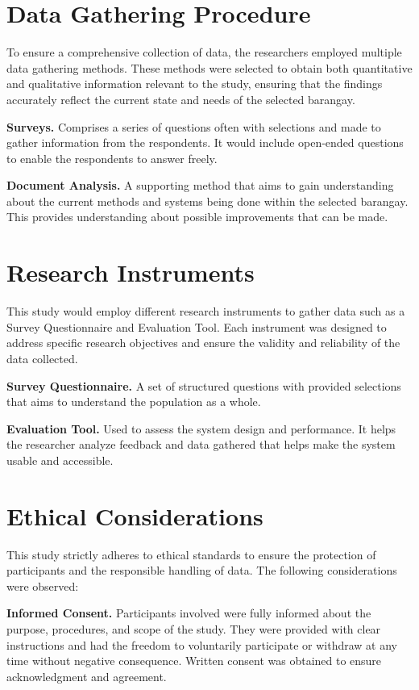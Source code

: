 \documentclass{research}
\begin{document}
\section{Data Gathering Procedure}

To ensure a comprehensive collection of data, the researchers employed multiple data gathering methods. These methods were selected to obtain both quantitative and qualitative information relevant to the study, ensuring that the findings accurately reflect the current state and needs of the selected barangay.

\textbf{Surveys.} Comprises a series of questions often with selections and made to gather information from the respondents. It would include open-ended questions to enable the respondents to answer freely.

\textbf{Document Analysis.} A supporting method that aims to gain understanding about the current methods and systems being done within the selected barangay. This provides understanding about possible improvements that can be made.

\section{Research Instruments}

This study would employ different research instruments to gather data such as a Survey Questionnaire and Evaluation Tool. Each instrument was designed to address specific research objectives and ensure the validity and reliability of the data collected.

\textbf{Survey Questionnaire.} A set of structured questions with provided selections that aims to understand the population as a whole.

\textbf{Evaluation Tool.} Used to assess the system design and performance. It helps the researcher analyze feedback and data gathered that helps make the system usable and accessible.

\section{Ethical Considerations}

This study strictly adheres to ethical standards to ensure the protection of participants and the responsible handling of data. The following considerations were observed:

\textbf{Informed Consent.} Participants involved were fully informed about the purpose, procedures, and scope of the study. They were provided with clear instructions and had the freedom to voluntarily participate or withdraw at any time without negative consequence. Written consent was obtained to ensure acknowledgment and agreement.
\end{document}
